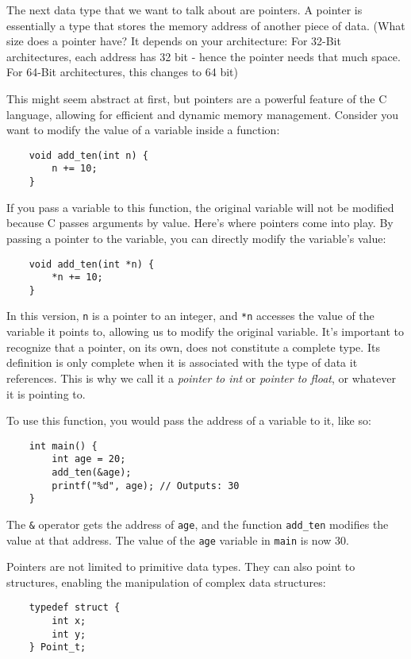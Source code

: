 \documentclass{dcbl/challenge}
\begin{document}
\begin{aufgabe}
    The next data type that we want to talk about are pointers.
    A pointer is essentially a type that stores the memory address of another piece of data. 
    (What size does a pointer have? It depends on your architecture: For 32-Bit architectures, each address has 32 bit - hence the pointer needs that much space. For 64-Bit architectures, this changes to 64 bit)
    
    This might seem abstract at first, but pointers are a powerful feature of the C language, allowing for efficient and dynamic memory management. 
    Consider you want to modify the value of a variable inside a function:
\begin{lstlisting}
    void add_ten(int n) {
        n += 10;
    }
\end{lstlisting}
If you pass a variable to this function, the original variable will not be modified because C passes arguments by value. 
Here's where pointers come into play. 
By passing a pointer to the variable, you can directly modify the variable's value:
\begin{lstlisting}
    void add_ten(int *n) {
        *n += 10;
    }
\end{lstlisting}
In this version, \texttt{n} is a pointer to an integer, and \texttt{*n} accesses the value of the variable it points to, allowing us to modify the original variable.
It's important to recognize that a pointer, on its own, does not constitute a complete type. Its definition is only complete when it is associated with the type of data it references.
This is why we call it a \textit{pointer to int} or \textit{pointer to float}, or whatever it is pointing to.

To use this function, you would pass the address of a variable to it, like so:
\begin{lstlisting}
    int main() {
        int age = 20;
        add_ten(&age);
        printf("%d", age); // Outputs: 30
    }
\end{lstlisting}
The \texttt{\&} operator gets the address of \texttt{age}, and the function \texttt{add\_ten} modifies the value at that address. 
The value of the \texttt{age} variable in \texttt{main} is now 30.

Pointers are not limited to primitive data types. They can also point to structures, enabling the manipulation of complex data structures:
\begin{lstlisting}
    typedef struct {
        int x;
        int y;
    } Point_t;


\end{lstlisting}
\end{aufgabe}
\end{document}
